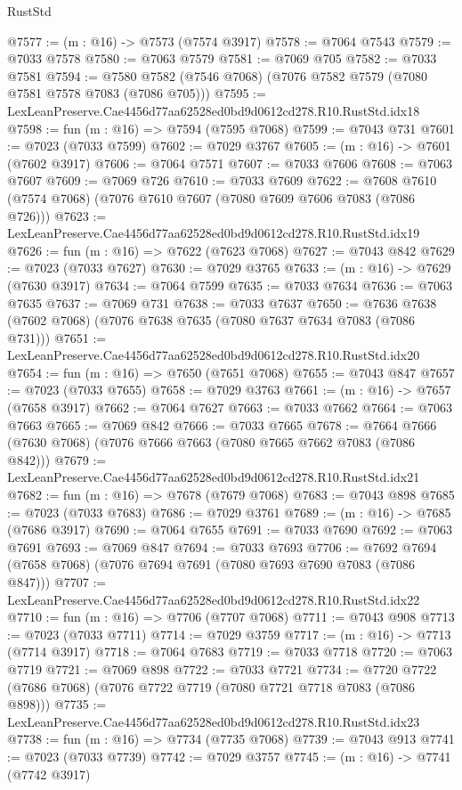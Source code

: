 \begin{lexlean}{RustStd}
\begin{coremodule}
@7577 := (m : @16) -> @7573 (@7574 @3917)
@7578 := @7064 @7543
@7579 := @7033 @7578
@7580 := @7063 @7579
@7581 := @7069 @705
@7582 := @7033 @7581
@7594 := @7580 @7582 (@7546 @7068) (@7076 @7582 @7579 (@7080 @7581 @7578 @7083 (@7086 @705)))
@7595 := LexLeanPreserve.Cae4456d77aa62528ed0bd9d0612cd278.R10.RustStd.idx18
@7598 := fun (m : @16) => @7594 (@7595 @7068)
@7599 := @7043 @731
@7601 := @7023 (@7033 @7599)
@7602 := @7029 @3767
@7605 := (m : @16) -> @7601 (@7602 @3917)
@7606 := @7064 @7571
@7607 := @7033 @7606
@7608 := @7063 @7607
@7609 := @7069 @726
@7610 := @7033 @7609
@7622 := @7608 @7610 (@7574 @7068) (@7076 @7610 @7607 (@7080 @7609 @7606 @7083 (@7086 @726)))
@7623 := LexLeanPreserve.Cae4456d77aa62528ed0bd9d0612cd278.R10.RustStd.idx19
@7626 := fun (m : @16) => @7622 (@7623 @7068)
@7627 := @7043 @842
@7629 := @7023 (@7033 @7627)
@7630 := @7029 @3765
@7633 := (m : @16) -> @7629 (@7630 @3917)
@7634 := @7064 @7599
@7635 := @7033 @7634
@7636 := @7063 @7635
@7637 := @7069 @731
@7638 := @7033 @7637
@7650 := @7636 @7638 (@7602 @7068) (@7076 @7638 @7635 (@7080 @7637 @7634 @7083 (@7086 @731)))
@7651 := LexLeanPreserve.Cae4456d77aa62528ed0bd9d0612cd278.R10.RustStd.idx20
@7654 := fun (m : @16) => @7650 (@7651 @7068)
@7655 := @7043 @847
@7657 := @7023 (@7033 @7655)
@7658 := @7029 @3763
@7661 := (m : @16) -> @7657 (@7658 @3917)
@7662 := @7064 @7627
@7663 := @7033 @7662
@7664 := @7063 @7663
@7665 := @7069 @842
@7666 := @7033 @7665
@7678 := @7664 @7666 (@7630 @7068) (@7076 @7666 @7663 (@7080 @7665 @7662 @7083 (@7086 @842)))
@7679 := LexLeanPreserve.Cae4456d77aa62528ed0bd9d0612cd278.R10.RustStd.idx21
@7682 := fun (m : @16) => @7678 (@7679 @7068)
@7683 := @7043 @898
@7685 := @7023 (@7033 @7683)
@7686 := @7029 @3761
@7689 := (m : @16) -> @7685 (@7686 @3917)
@7690 := @7064 @7655
@7691 := @7033 @7690
@7692 := @7063 @7691
@7693 := @7069 @847
@7694 := @7033 @7693
@7706 := @7692 @7694 (@7658 @7068) (@7076 @7694 @7691 (@7080 @7693 @7690 @7083 (@7086 @847)))
@7707 := LexLeanPreserve.Cae4456d77aa62528ed0bd9d0612cd278.R10.RustStd.idx22
@7710 := fun (m : @16) => @7706 (@7707 @7068)
@7711 := @7043 @908
@7713 := @7023 (@7033 @7711)
@7714 := @7029 @3759
@7717 := (m : @16) -> @7713 (@7714 @3917)
@7718 := @7064 @7683
@7719 := @7033 @7718
@7720 := @7063 @7719
@7721 := @7069 @898
@7722 := @7033 @7721
@7734 := @7720 @7722 (@7686 @7068) (@7076 @7722 @7719 (@7080 @7721 @7718 @7083 (@7086 @898)))
@7735 := LexLeanPreserve.Cae4456d77aa62528ed0bd9d0612cd278.R10.RustStd.idx23
@7738 := fun (m : @16) => @7734 (@7735 @7068)
@7739 := @7043 @913
@7741 := @7023 (@7033 @7739)
@7742 := @7029 @3757
@7745 := (m : @16) -> @7741 (@7742 @3917)

\end{coremodule}
\end{lexlean}
